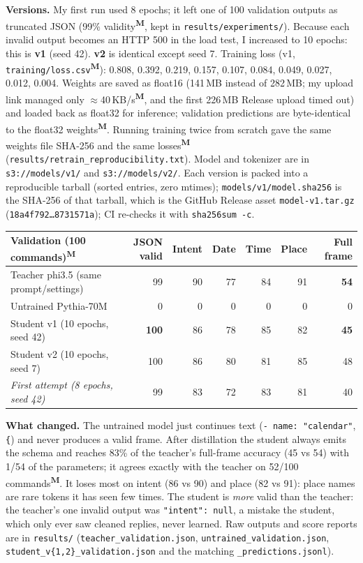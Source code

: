 \documentclass[10pt,a4paper]{article}
\newcommand{\code}[1]{\texttt{\small #1}}
\newcommand{\meas}{\textsuperscript{\textbf{M}}}
\begin{document}
\textbf{Versions.} My first run used 8 epochs; it left one of 100 validation outputs as truncated JSON
(99\% validity\meas{}, kept in \code{results/experiments/}). Because each invalid output becomes an HTTP 500 in the
load test, I increased to 10 epochs: this is \textbf{v1} (seed 42). \textbf{v2} is identical except seed 7.
Training loss (v1, \code{training/loss.csv}\meas{}): 0.808, 0.392, 0.219, 0.157, 0.107, 0.084, 0.049, 0.027, 0.012, 0.004.
Weights are saved as float16 (141\,MB instead of 282\,MB; my upload link managed only $\approx$40\,KB/s\meas{},
and the first 226\,MB Release upload timed out) and loaded back as float32 for inference; validation predictions
are byte-identical to the float32 weights\meas{}. Running training twice from scratch gave the same weights file
SHA-256 and the same losses\meas{} (\code{results/retrain\_reproducibility.txt}).
Model and tokenizer are in \code{s3://models/v1/} and \code{s3://models/v2/}. Each version is packed into a
reproducible tarball (sorted entries, zero mtimes); \code{models/v1/model.sha256} is the SHA-256 of that tarball,
which is the GitHub Release asset \code{model-v1.tar.gz} (\code{18a4f792\ldots 8731571a}); CI re-checks it with
\code{sha256sum -c}.

\begin{center}\small
\begin{tabular}{lrrrrrr}
\toprule
Validation (100 commands)\meas{} & JSON valid & Intent & Date & Time & Place & Full frame\\
\midrule
Teacher phi3.5 (same prompt/settings) & 99 & 90 & 77 & 84 & 91 & \textbf{54}\\
Untrained Pythia-70M & 0 & 0 & 0 & 0 & 0 & 0\\
Student v1 (10 epochs, seed 42) & \textbf{100} & 86 & 78 & 85 & 82 & \textbf{45}\\
Student v2 (10 epochs, seed 7) & 100 & 86 & 80 & 81 & 85 & 48\\
\emph{First attempt (8 epochs, seed 42)} & 99 & 83 & 72 & 83 & 81 & 40\\
\bottomrule
\end{tabular}
\end{center}
\textbf{What changed.} The untrained model just continues text (\code{- name: "calendar"}, \code{\{}) and never
produces a valid frame. After distillation the student always emits the schema and reaches 83\% of the teacher's
full-frame accuracy (45 vs 54) with 1/54 of the parameters; it agrees exactly with the teacher on 52/100
commands\meas{}. It loses most on intent (86 vs 90) and place (82 vs 91): place names are rare tokens it has seen
few times. The student is \emph{more} valid than the teacher: the teacher's one invalid output was
\code{"intent": null}, a mistake the student, which only ever saw cleaned replies, never learned. Raw outputs and
score reports are in \code{results/} (\code{teacher\_validation.json}, \code{untrained\_validation.json},
\code{student\_v\{1,2\}\_validation.json} and the matching \code{*\_predictions.jsonl}).
\end{document}

